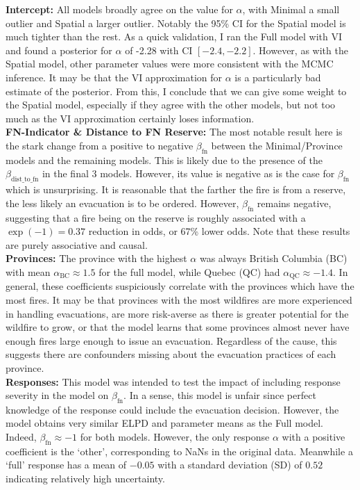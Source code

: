\textbf{Intercept:} All models broadly agree on the value for $\alpha$, with Minimal a small outlier and Spatial a larger outlier. Notably the 95\% CI for the Spatial model is much tighter than the rest. As a quick validation, I ran the Full model with VI and found a posterior for $\alpha$ of -2.28 with CI $[-2.4, -2.2]$. However, as with the Spatial model, other parameter values were more consistent with the MCMC inference. It may be that the VI approximation for $\alpha$ is a particularly bad estimate of the posterior. From this, I conclude that we can give some weight to the Spatial model, especially if they agree with the other models, but not too much as the VI approximation certainly loses information.\\
\textbf{FN-Indicator \& Distance to FN Reserve:} The most notable result here is the stark change from a positive to negative $\beta_{\text{fn}}$ between the Minimal/Province models and the remaining models. This is likely due to the presence of the $\beta_{\text{dist\_to\_fn}}$ in the final 3 models. However, its value is negative as is the case for $\beta_{\text{fn}}$ which is unsurprising. It is reasonable that the farther the fire is from a reserve, the less likely an evacuation is to be ordered. However, $\beta_{\text{fn}}$ remains negative, suggesting that a fire being on the reserve is roughly associated with a $\exp(-1)=0.37$ reduction in odds, or 67\% lower odds. Note that these results are purely associative and causal.\\
\textbf{Provinces:} The province with the highest $\alpha$ was always British Columbia (BC) with mean $\alpha_{\text{BC}} \approx 1.5$ for the full model, while Quebec (QC) had $\alpha_{\text{QC}} \approx -1.4$. In general, these coefficients suspiciously correlate with the provinces which have the most fires. It may be that provinces with the most wildfires are more experienced in handling evacuations, are more risk-averse as there is greater potential for the wildfire to grow, or that the model learns that some provinces almost never have enough fires large enough to issue an evacuation. Regardless of the cause, this suggests there are confounders missing about the evacuation practices of each province.\\
\textbf{Responses:} This model was intended to test the impact of including response severity in the model on $\beta_{\text{fn}}$. In a sense, this model is unfair since perfect knowledge of the response could include the evacuation decision. However, the model obtains very similar ELPD and parameter means as the Full model. Indeed, $\beta_{\text{fn}}\approx -1$ for both models. However, the only response $\alpha$ with a positive coefficient is the `other', corresponding to NaNs in the original data. Meanwhile a `full' response has a mean of $-0.05$ with a standard deviation (SD) of $0.52$ indicating relatively high uncertainty. \\
